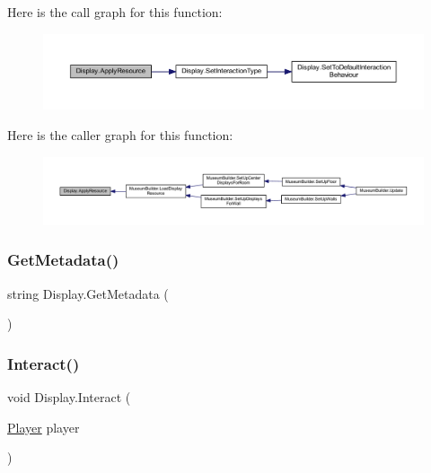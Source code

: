 Here is the call graph for this function\+:
\nopagebreak
\begin{figure}[H]
\begin{center}
\leavevmode
\includegraphics[width=350pt]{class_display_a811157ddb42ae4d72f690457a08711d3_cgraph}
\end{center}
\end{figure}
Here is the caller graph for this function\+:
\nopagebreak
\begin{figure}[H]
\begin{center}
\leavevmode
\includegraphics[width=350pt]{class_display_a811157ddb42ae4d72f690457a08711d3_icgraph}
\end{center}
\end{figure}
\mbox{\label{class_display_a293687a976cbe23a09b7c6ddef36a48d}} 
\subsubsection{\texorpdfstring{Get\+Metadata()}{GetMetadata()}}
{\footnotesize\ttfamily string Display.\+Get\+Metadata (\begin{DoxyParamCaption}{ }\end{DoxyParamCaption})}

\mbox{\label{class_display_a43fc2a6f19bbf2f1bdb676392b37e921}} 
\subsubsection{\texorpdfstring{Interact()}{Interact()}}
{\footnotesize\ttfamily void Display.\+Interact (\begin{DoxyParamCaption}\item[{\mbox{\hyperlink{class_player}{Player}}}]{player }\end{DoxyParamCaption})}



